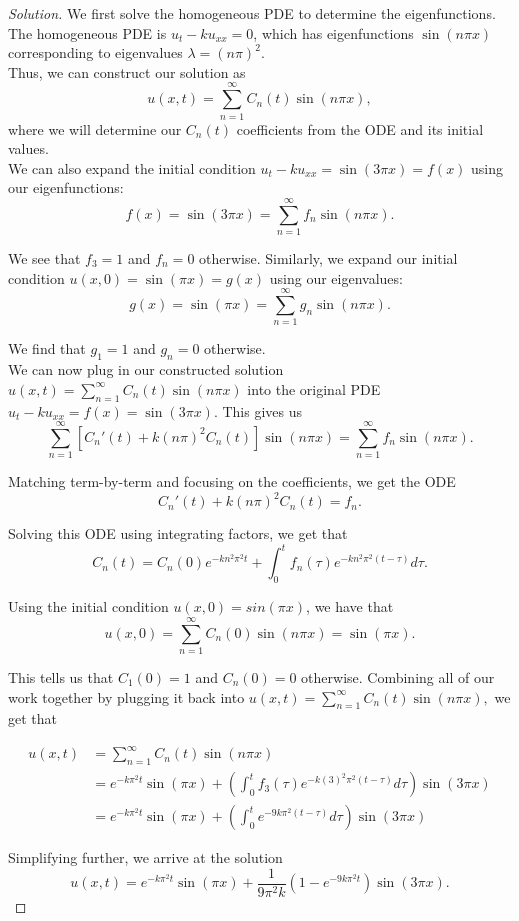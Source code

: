 \documentclass[11pt]{article}
\newenvironment{solution}
  {\renewcommand\qedsymbol{$\blacksquare$}\begin{proof}[Solution]}
  {\end{proof}}
\begin{document}
\begin{solution}
We first solve the homogeneous PDE to determine the eigenfunctions. The homogeneous PDE is $u_t - ku_{xx} = 0$, which has eigenfunctions $\sin(n\pi x)$ corresponding to eigenvalues $\lambda = (n\pi)^2.$ \\

Thus, we can construct our solution as 
\[ u(x, t) = \sum\limits_{n=1}^{\infty} C_n(t) \sin(n\pi x), \] where we will determine our $C_n(t)$ coefficients from the ODE and its initial values. \\

We can also expand the initial condition $u_t - ku_{xx} = \sin(3\pi x) = f(x)$ using our eigenfunctions:
\[ f(x) = \sin(3\pi x) = \sum\limits_{n=1}^{\infty} f_n\sin(n\pi x). \]

We see that $f_3 = 1$ and $f_n = 0$ otherwise. Similarly, we expand our initial condition $u(x, 0) = \sin(\pi x) = g(x)$ using our eigenvalues:
\[ g(x) = \sin(\pi x) = \sum\limits_{n=1}^{\infty} g_n\sin(n\pi x). \]

We find that $g_1 = 1$ and $g_n = 0$ otherwise. \\

We can now plug in our constructed solution $u(x, t) = \sum\limits_{n=1}^{\infty} C_n(t) \sin(n\pi x)$ into the original PDE $u_t - ku_{xx} = f(x) = \sin(3\pi x).$ This gives us
\[ \sum\limits_{n=1}^{\infty}\left[C_n'(t) + k(n\pi)^2 C_n(t) \right]\sin(n\pi x) = \sum\limits_{n=1}^{\infty} f_n \sin(n\pi x). \]

Matching term-by-term and focusing on the coefficients, we get the ODE
\[ C_n'(t) + k(n\pi)^2 C_n(t) = f_n.\]

Solving this ODE using integrating factors, we get that
\[ C_n(t) = C_n(0)e^{-kn^2\pi^2t} + \int_0^t f_n(\tau)e^{-kn^2\pi^2(t-\tau)} d\tau. \]

Using the initial condition $u(x, 0) = sin(\pi x)$, we have that
\[ u(x, 0) = \sum\limits_{n=1}^{\infty} C_n(0)\sin(n\pi x) = \sin(\pi x). \]

This tells us that $C_{1}(0) = 1$ and $C_{n}(0) = 0$ otherwise. Combining all of our work together by plugging it back into $u(x, t) = \sum\limits_{n=1}^{\infty} C_n(t) \sin(n\pi x),$ we get that

\begin{align*} u(x, t) &= \sum\limits_{n=1}^{\infty} C_n(t)\sin(n\pi x)  \\
    &= e^{-k\pi^2 t}\sin(\pi x) + \left( \int_0^t f_3(\tau) e^{-k(3)^2\pi^2(t-\tau)} d\tau\right) \sin(3\pi x) \\
    &= e^{-k\pi^2 t}\sin(\pi x) + \left(\int_0^t e^{-9k\pi^2(t-\tau)} d\tau\right) \sin(3\pi x) \end{align*}

Simplifying further, we arrive at the solution
\[ \boxed{u(x, t) = e^{-k\pi^2 t}\sin(\pi x) + \frac{1}{9\pi^2k}\left(1 - e^{-9k\pi^2t}\right) \sin(3\pi x)}.\]
\end{solution}
\end{document}
